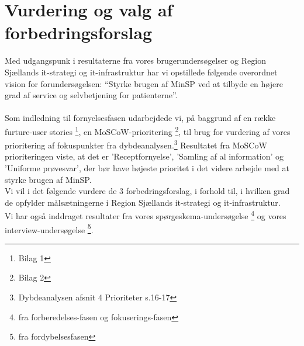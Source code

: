 %
%
%
%
%
%
%
%
%
%
%
%
%
%
%
%
%
%
%
%
%
%
%
%
%
%
%
%
%
\section{Vurdering og valg af forbedringsforslag}
Med udgangspunk i resultaterne fra vores brugerundersøgelser og Region Sjællands it-strategi og it-infrastruktur har vi opstillede følgende overordnet vision for forundersøgelsen: “Styrke brugen af MinSP ved at tilbyde en højere grad af service og selvbetjening for patienterne”.\\
\\
Som indledning til fornyelsesfasen udarbejdede vi, på baggrund af en række furture-user stories \footnote{Bilag 1}, en MoSCoW-prioritering \footnote{Bilag 2}, til brug for vurdering af vores prioritering af fokuspunkter fra dybdeanalysen.\footnote{Dybdeanalysen afsnit 4 Prioriteter s.16-17}
Resultatet fra MoSCoW prioriteringen viste, 
at det er 'Receptfornyelse', 'Samling af al information' og 'Uniforme prøvesvar', der bør have højeste prioritet i det videre arbejde med at styrke brugen af MinSP.\\  %
Vi vil i det følgende vurdere de 3 forbedringsforslag, i forhold til,
i hvilken grad de opfylder målsætningerne i Region Sjællands it-strategi og it-infrastruktur. \\
Vi har også inddraget resultater fra vores spørgeskema-undersøgelse \footnote{fra forberedelses-fasen og fokuserings-fasen} og vores interview-undersøgelse \footnote{fra fordybelsesfasen}.
